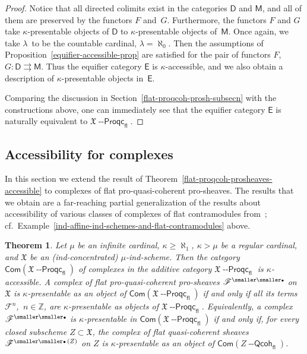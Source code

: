 \documentclass[12pt,a4paper]{amsart}
\newcommand{\+}{\protect\nobreakdash-}
\renewcommand{\:}{\colon}
\newcommand{\bu}{{\text{\smaller\smaller$\scriptstyle\bullet$}}}
\newcommand{\Qcoh}{{\operatorname{\mathsf{--Qcoh}}}}
\newcommand{\Proqc}{{\operatorname{\mathsf{--Proqc}}}}
\newcommand{\fl}{\mathsf{fl}}
\newcommand{\Com}{\mathsf{Com}}
\newcommand{\sD}{\mathsf D}
\newcommand{\sE}{\mathsf E}
\newcommand{\sM}{\mathsf M}
\newcommand{\fX}{\mathfrak X}
\newcommand{\rF}{\mathscr F}
\newcommand{\boZ}{\mathbb Z}
\theoremstyle{plain}
\newtheorem{thm}{Theorem}[section]
\theoremstyle{definition}
\begin{document}
\begin{proof}
 Notice that all directed colimits exist in the categories $\sD$
and $\sM$, and all of them are preserved by the functors $F$ and~$G$.
 Furthermore, the functors $F$ and $G$ take $\kappa$\+presentable
objects of $\sD$ to $\kappa$\+presentable objects of~$\sM$.
 Once again, we take $\lambda$~to be the countable cardinal,
$\lambda=\aleph_0$.
 Then the assumptions of Proposition~\ref{equifier-accessible-prop} are
satisfied for the pair of functors $F$, $G\:\sD\rightrightarrows\sM$.
 Thus the equifier category $\sE$ is $\kappa$\+accessible, and
we also obtain a description of $\kappa$\+presentable objects in~$\sE$.

 Comparing the discussion in Section~\ref{flat-proqcoh-prosh-subsecn}
with the constructions above, one can immediately see that the equifier
category $\sE$ is naturally equivalent to $\fX\Proqc_\fl$.
\end{proof}

\subsection{Accessibility for complexes}
 In this section we extend the result of
Theorem~\ref{flat-proqcoh-prosheaves-accessible} to complexes of
flat pro-quasi-coherent pro-sheaves.
 The results that we obtain are a far-reaching partial generalization
of the results about accessibility of various classes of complexes of
flat contramodules from~\cite[Proposition~10.2 and
Corollary~11.4]{Pflcc}; cf.\
Example~\ref{ind-affine-ind-schemes-and-flat-contramodules} above.

\begin{thm} \label{complexes-of-flat-proqcoh-prosheaves-accessible}
 Let\/ $\mu$ be an infinite cardinal, $\kappa\ge\aleph_1$, $\kappa>\mu$
be a regular cardinal, and\/ $\fX$ be an (ind-concentrated)
$\mu$\+ind-scheme.
 Then the category\/ $\Com(\fX\Proqc_\fl)$ of complexes in
the additive category\/ $\fX\Proqc_\fl$ is\/ $\kappa$\+accessible.
 A complex of flat pro-quasi-coherent pro-sheaves\/ $\rF^\bu$ on\/ $\fX$
is\/ $\kappa$\+presentable as an object of\/ $\Com(\fX\Proqc_\fl)$
if and only if all its terms\/ $\rF^n$, \,$n\in\boZ$, are\/
$\kappa$\+presentable as objects of\/ $\fX\Proqc_\fl$.
 Equivalently, a complex\/ $\rF^\bu$ is\/ $\kappa$\+presentable in\/
$\Com(\fX\Proqc_\fl)$ if and only if, for every closed subscheme
$Z\subset\fX$, the complex of flat quasi-coherent sheaves
$\rF^{\bu\,(Z)}$ on $Z$ is\/ $\kappa$\+presentable as an object of\/
$\Com(Z\Qcoh_\fl)$.
\end{thm}
\end{document}
